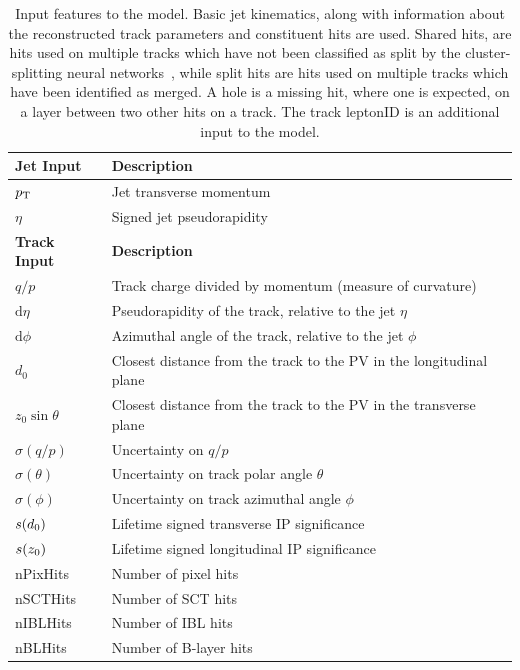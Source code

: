 \begin{table}[!htbp]
  \footnotesize\centering
  \setlength{\tabcolsep}{0.5em} %
  \caption{
    Input features to the \GNN model.
    Basic jet kinematics, along with information about the reconstructed track parameters and constituent hits are used.
    Shared hits, are hits used on multiple tracks which have not been classified as split by the cluster-splitting neural networks~\cite{PERF-2015-08}, while split hits are hits used on multiple tracks which have been identified as merged.
    A hole is a missing hit, where one is expected, on a layer between two other hits on a track.
    The track leptonID is an additional input to the \GNNLep model.
  }
  \begin{tabular}{ll}
    \toprule 
    \textbf{Jet Input} & \textbf{Description} \\
    \hline
    $p_{\text{T}}$ & Jet transverse momentum \\
    $\eta$ & Signed jet pseudorapidity \\
    \toprule
    \textbf{Track Input} & \textbf{Description} \\
    \hline
    $q/p$ & Track charge divided by momentum (measure of curvature) \\
    $\mathrm{d}\eta$ & Pseudorapidity of the track, relative to the jet $\eta$ \\
    $\mathrm{d}\phi$  & Azimuthal angle of the track, relative to the jet $\phi$ \\
    $d_0$  & Closest distance from the track to the PV in the longitudinal plane \\
    $z_0 \sin\theta$  & Closest distance from the track to the PV in the transverse plane \\
    $\sigma(q/p)$ & Uncertainty on $q/p$ \\
    $\sigma(\theta)$ & Uncertainty on track polar angle $\theta$ \\
    $\sigma(\phi)$  & Uncertainty on track azimuthal angle $\phi$ \\
    $s(d_0)$  & Lifetime signed transverse IP significance \\
    $s(z_0)$  & Lifetime signed longitudinal IP significance \\
    nPixHits   & Number of pixel hits \\
    nSCTHits   & Number of SCT hits \\
    nIBLHits   & Number of IBL hits \\
    nBLHits    & Number of B-layer hits \\

\end{tabular}
\end{table}
